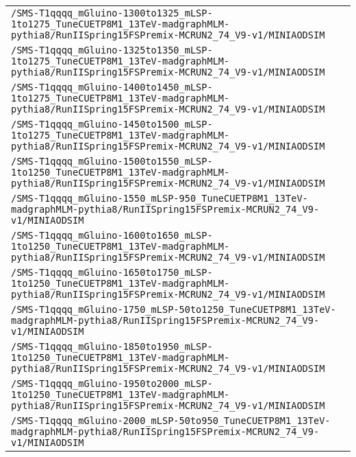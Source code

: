 \begin{center}
\begin{tabular}{l}
\verb!/SMS-T1qqqq_mGluino-1300to1325_mLSP-1to1275_TuneCUETP8M1_13TeV-madgraphMLM-pythia8/RunIISpring15FSPremix-MCRUN2_74_V9-v1/MINIAODSIM! \tabularnewline
\verb!/SMS-T1qqqq_mGluino-1325to1350_mLSP-1to1275_TuneCUETP8M1_13TeV-madgraphMLM-pythia8/RunIISpring15FSPremix-MCRUN2_74_V9-v1/MINIAODSIM! \tabularnewline
\verb!/SMS-T1qqqq_mGluino-1400to1450_mLSP-1to1275_TuneCUETP8M1_13TeV-madgraphMLM-pythia8/RunIISpring15FSPremix-MCRUN2_74_V9-v1/MINIAODSIM! \tabularnewline
\verb!/SMS-T1qqqq_mGluino-1450to1500_mLSP-1to1275_TuneCUETP8M1_13TeV-madgraphMLM-pythia8/RunIISpring15FSPremix-MCRUN2_74_V9-v1/MINIAODSIM! \tabularnewline
\verb!/SMS-T1qqqq_mGluino-1500to1550_mLSP-1to1250_TuneCUETP8M1_13TeV-madgraphMLM-pythia8/RunIISpring15FSPremix-MCRUN2_74_V9-v1/MINIAODSIM! \tabularnewline
\verb!/SMS-T1qqqq_mGluino-1550_mLSP-950_TuneCUETP8M1_13TeV-madgraphMLM-pythia8/RunIISpring15FSPremix-MCRUN2_74_V9-v1/MINIAODSIM! \tabularnewline
\verb!/SMS-T1qqqq_mGluino-1600to1650_mLSP-1to1250_TuneCUETP8M1_13TeV-madgraphMLM-pythia8/RunIISpring15FSPremix-MCRUN2_74_V9-v1/MINIAODSIM! \tabularnewline
\verb!/SMS-T1qqqq_mGluino-1650to1750_mLSP-1to1250_TuneCUETP8M1_13TeV-madgraphMLM-pythia8/RunIISpring15FSPremix-MCRUN2_74_V9-v1/MINIAODSIM! \tabularnewline
\verb!/SMS-T1qqqq_mGluino-1750_mLSP-50to1250_TuneCUETP8M1_13TeV-madgraphMLM-pythia8/RunIISpring15FSPremix-MCRUN2_74_V9-v1/MINIAODSIM! \tabularnewline
\verb!/SMS-T1qqqq_mGluino-1850to1950_mLSP-1to1250_TuneCUETP8M1_13TeV-madgraphMLM-pythia8/RunIISpring15FSPremix-MCRUN2_74_V9-v1/MINIAODSIM! \tabularnewline
\verb!/SMS-T1qqqq_mGluino-1950to2000_mLSP-1to1250_TuneCUETP8M1_13TeV-madgraphMLM-pythia8/RunIISpring15FSPremix-MCRUN2_74_V9-v1/MINIAODSIM! \tabularnewline
\verb!/SMS-T1qqqq_mGluino-2000_mLSP-50to950_TuneCUETP8M1_13TeV-madgraphMLM-pythia8/RunIISpring15FSPremix-MCRUN2_74_V9-v1/MINIAODSIM! \tabularnewline
\hline
\end{tabular}\end{center}
